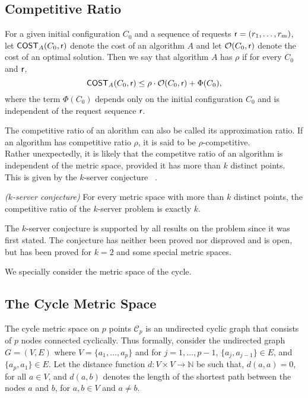 \subsection{Competitive Ratio}\label{competitive-ratio}

For a given initial configuration $C_0$ and a sequence of requests $\sf{r}=(r_1, \hdots ,r_m)$, let $\sf{COST}_A(C_0, \sf{r})$ denote the cost of an algorithm $A$ and let $\mathcal{O}(C_0,\sf{r})$ denote the cost of an optimal solution. Then we say that algorithm $A$ has  $\rho$ if for every $C_0$ and $\sf{r}$, $$\sf{COST}_A(C_0, \sf{r}) \le \rho \cdot \mathcal{O}(C_0,\sf{r}) + \Phi(C_0),$$ where the term $\Phi(C_0)$ depends only on the initial configuration $C_0$ and is independent of the request sequence $\sf{r}$. 

The competitive ratio of an alorithm can also be called its approximation ratio. If an algorithm has competitive ratio $\rho$, it is said to be $\rho$-competitive. \\

Rather unexpectedly, it is likely that the competitve ratio of an algorithm is independent of the metric space, provided it has more than $k$ distinct points. This is given by the $k$-server conjecture ~\cite{MMS88}.

\begin{conjecture}\label{thrm:k-server-conjecture}
\emph{($k$-server conjecture)}
For every metric space with more than $k$ distinct points, the competitive ratio of the $k$-server problem is exactly $k$.
\end{conjecture}

The $k$-server conjecture is supported by all results on the problem since it was first stated. The conjecture has neither been proved nor disproved and is open, but has been proved for $k=2$ and some special metric spaces.

We specially consider the metric space of the cycle.

\subsection{The Cycle Metric Space}\label{cycle-metric-space}

The cycle metric space on $p$ points $\mathcal{C}_p$ is an undirected cyclic graph that consists of $p$ nodes connected cyclically. Thus formally, consider the undirected graph $G=(V,E)$ where $V=\{a_1,\hdots,a_p\}$ and for $j=1,\hdots,p-1$, $\{a_j,a_{j-1}\}\in E$, and $\{a_p,a_1\}\in E$. Let the distance function $d:V\times V\rightarrow \mathbb{N}$ be such that, $d(a,a)=0$, for all $a\in V$, and $d(a,b)$ denotes the length of the shortest path between the nodes $a$ and $b$, for $a,b\in V$ and $a \neq b$.

